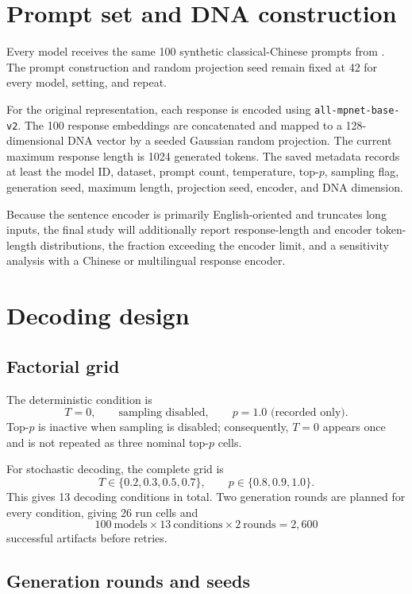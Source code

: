 \documentclass[11pt,a4paper]{article}
\newcommand{\method}[1]{\texttt{#1}}
\begin{document}
\section{Prompt set and DNA construction}

Every model receives the same 100 synthetic classical-Chinese prompts from
. The prompt construction and random
projection seed remain fixed at 42 for every model, setting, and repeat.

For the original representation, each response is encoded using
\method{all-mpnet-base-v2}. The 100 response embeddings are concatenated and
mapped to a 128-dimensional DNA vector by a seeded Gaussian random projection.
The current maximum response length is 1024 generated tokens. The saved
metadata records at least the model ID, dataset, prompt count, temperature,
top-$p$, sampling flag, generation seed, maximum length, projection seed,
encoder, and DNA dimension.

Because the sentence encoder is primarily English-oriented and truncates long
inputs, the final study will additionally report response-length and encoder
token-length distributions, the fraction exceeding the encoder limit, and a
sensitivity analysis with a Chinese or multilingual response encoder.

\section{Decoding design}

\subsection{Factorial grid}

The deterministic condition is
\[
  T=0, \qquad \text{sampling disabled}, \qquad p=1.0\text{ (recorded only)}.
\]
Top-$p$ is inactive when sampling is disabled; consequently, $T=0$ appears once
and is not repeated as three nominal top-$p$ cells.

For stochastic decoding, the complete grid is
\[
  T\in\{0.2,0.3,0.5,0.7\}, \qquad
  p\in\{0.8,0.9,1.0\}.
\]
This gives 13 decoding conditions in total. Two generation rounds are planned
for every condition, giving 26 run cells and
\[
  100\ \text{models}\times13\ \text{conditions}\times2\ \text{rounds}
  =2{,}600
\]
successful artifacts before retries.

\subsection{Generation rounds and seeds}
\end{document}
